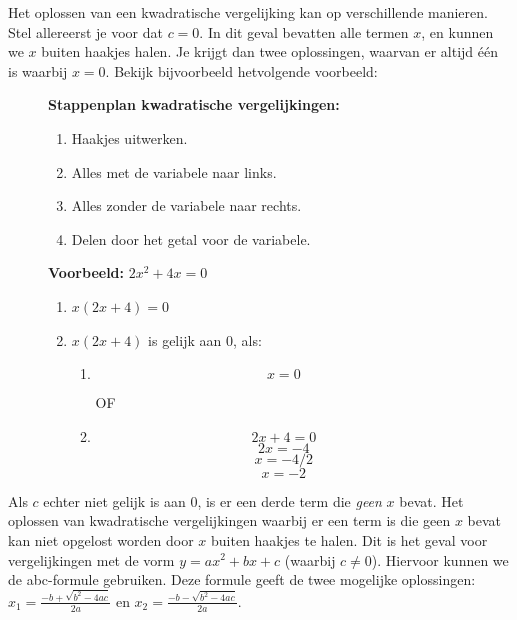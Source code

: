 \documentclass[
  a4paper,
]{scrbook}
\theoremstyle{definition}
\theoremstyle{remark}
\begin{document}
Het oplossen van een kwadratische vergelijking kan op verschillende
manieren. Stel allereerst je voor dat \(c = 0\). In dit geval bevatten
alle termen \(x\), en kunnen we \(x\) buiten haakjes halen. Je krijgt
dan twee oplossingen, waarvan er altijd één is waarbij \(x=0\). Bekijk
bijvoorbeeld hetvolgende voorbeeld:

\begin{figure}

\begin{minipage}{0.45\linewidth}
\textbf{Stappenplan kwadratische vergelijkingen:}

\begin{enumerate}
\def\labelenumi{\arabic{enumi}.}
\item
  Haakjes uitwerken.
\item
  Alles met de variabele naar links.
\item
  Alles zonder de variabele naar rechts.
\item
  Delen door het getal voor de variabele.
\end{enumerate}

\end{minipage}%
%
\begin{minipage}{0.55\linewidth}
\textbf{Voorbeeld:} \(2x^2 + 4x = 0\)

\begin{enumerate}
\def\labelenumi{\arabic{enumi}.}
\item
  \(x(2x+4) = 0\)
\item
  \(x(2x+4)\) is gelijk aan 0, als:

  \begin{enumerate}
  \def\labelenumii{\arabic{enumii}.}
  \item
    \[ x = 0 \]

    OF
  \item
    \[2x+4 = 0\] \[2x = -4\] \[x = -4/2\] \[x = -2\]
  \end{enumerate}
\end{enumerate}

\end{minipage}%

\end{figure}%

Als \(c\) echter niet gelijk is aan \(0\), is er een derde term die
\emph{geen} \(x\) bevat. Het oplossen van kwadratische vergelijkingen
waarbij er een term is die geen \(x\) bevat kan niet opgelost worden
door \(x\) buiten haakjes te halen. Dit is het geval voor vergelijkingen
met de vorm \(y = ax^2 + bx + c\) (waarbij \(c \neq 0\)). Hiervoor
kunnen we de abc-formule gebruiken. Deze formule geeft de twee mogelijke
oplossingen: \(x_{1} = \frac{-b + \sqrt{b^2 - 4ac}}{2a}\) en
\(x_{2} = \frac{-b - \sqrt{b^2 - 4ac}}{2a}\).
\end{document}
